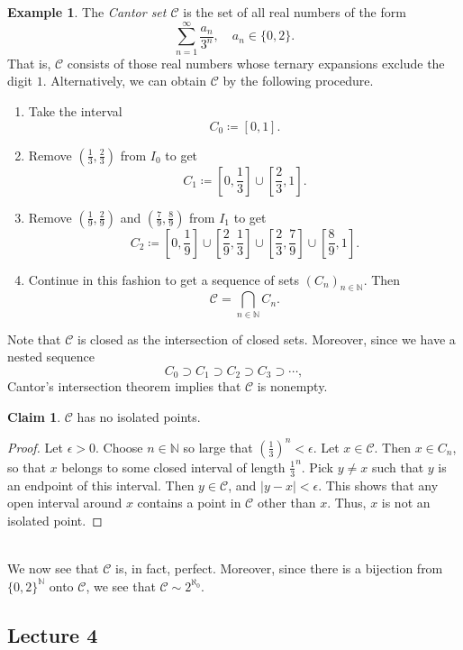 \documentclass[10pt,letterpaper,cm]{nupset}
\theoremstyle{definition}
\newtheorem{exmp}[definition]{Example}
\theoremstyle{theorem}
\newtheorem*{claim}{Claim}
\theoremstyle{remark}
\newcommand{\N}{\mathbb N}
\newcommand{\1}{\mathbf{1}}
\newcommand{\0}{\vec 0}
\begin{document}
\begin{exmp}
The \textit{Cantor set $\bm{\mathcal{C}}$} is the set of all real numbers of the form $$\sum_{n=1}^{\infty}\frac{a_n}{3^n}, \quad a_n\in \{0,2\}.$$ That is, $\bm{\mathcal{C}}$ consists of those real numbers whose ternary expansions exclude the digit $1$. Alternatively, we can obtain $\bm{\mathcal{C}}$ by the following procedure. 
\begin{enumerate}
\item Take the interval $$C_0 \coloneqq \left[0,1\right].$$
\item Remove $\left(\frac{1}{3}, \frac{2}{3}\right)$ from $I_0$ to get $$C_1\coloneqq \left[0, \frac{1}{3}\right] \cup \left[\frac{2}{3}, 1\right].$$
\item Remove $\left(\frac{1}{9}, \frac{2}{9}\right)$  and $\left(\frac{7}{9}, \frac{8}{9}\right)$ from $I_1$ to get $$C_2 \coloneqq \left[0, \frac{1}{9}\right] \cup \left[\frac{2}{9}, \frac{1}{3}\right] \cup \left[\frac{2}{3}, \frac{7}{9}\right] \cup \left[\frac{8}{9}, 1\right]      .$$
\item Continue in this fashion to get a sequence of sets $(C_n)_{n\in \N}$. Then $$\bm{\mathcal{C}} = \bigcap_{n\in\N} C_n.$$
\end{enumerate}$ $Note that $\bm{\mathcal{C}}$ is closed as the intersection of closed sets. Moreover, since we have a nested sequence $$C_0 \supset C_1 \supset C_2 \supset C_3 \supset \cdots, $$ Cantor's intersection theorem implies that $\bm{\mathcal{C}} $ is nonempty.
\begin{claim}
$\bm{\mathcal{C}}$ has no isolated points. 
\end{claim}
\begin{proof}
Let $\epsilon >0$. Choose $n\in \N$ so large that $(\frac{1}{3})^n <\epsilon$. Let $x\in \bm{\mathcal{C}}$. Then $x\in C_n$, so that $x$ belongs to some closed interval of length $\frac{1}{3}^n$. Pick $y \ne x$ such that $y$ is an endpoint of this interval. Then $y\in \bm{\mathcal{C}}$, and $\lvert{y-x}\rvert < \epsilon$. This shows that any open interval around $x$ contains a point in $\bm{\mathcal{C}}$ other than $x$. Thus, $x$ is not an isolated point.
\end{proof}$ $
\\We now see that $\bm{\mathcal{C}}$ is, in fact, perfect. Moreover, since there is a bijection from $\{0,2\}^{\N}$ onto $\bm{\mathcal{C}}$, we see that $\bm{\mathcal{C}} \sim 2^{\aleph_0}$. 
\end{exmp}


\subsection{Lecture 4}
\end{document}
